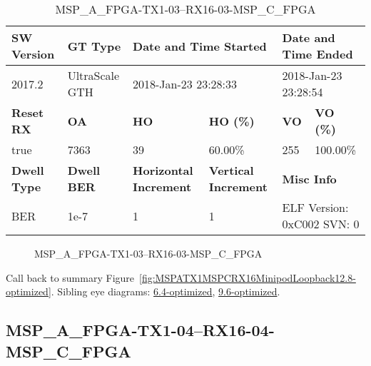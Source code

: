 \begin{table}[h]
\centering
\caption{MSP\_A\_FPGA-TX1-03--RX16-03-MSP\_C\_FPGA}
\label{tab:MSPAFPGATX103RX1603MSPCFPGA12.8-optimized}
\begin{tabular}{@{}|l|l|l|l|l|l|@{}}
\toprule
\textbf{SW Version}                & \textbf{GT Type}   & \multicolumn{2}{l|}{\textbf{Date and Time Started}}            & \multicolumn{2}{l|}{\textbf{Date and Time Ended}}        \\ \midrule
2017.2                       & UltraScale GTH          & \multicolumn{2}{l|}{2018-Jan-23 23:28:33}                   & \multicolumn{2}{l|}{2018-Jan-23 23:28:54}               \\ \midrule
\textbf{Reset RX}                  & \textbf{OA} & \textbf{HO}   & \textbf{HO (\%)} & \textbf{VO} & \textbf{VO (\%)} \\ \midrule
true & 7363        & 39          & 60.00\%        & 255        & 100.00\%       \\ \midrule
\textbf{Dwell Type}                & \textbf{Dwell BER} & \textbf{Horizontal Increment} & \textbf{Vertical Increment}    & \multicolumn{2}{l|}{\textbf{Misc Info}}                  \\ \midrule
BER                            & 1e-7        & 1        & 1           & \multicolumn{2}{l|}{ELF Version: 0xC002 SVN: 0}                         \\ \bottomrule
\end{tabular}
\end{table}

\begin{figure}[h]
\caption{MSP\_A\_FPGA-TX1-03--RX16-03-MSP\_C\_FPGA} \label{fig:MSPAFPGATX103RX1603MSPCFPGA12.8-optimized}
\end{figure}

Call back to summary Figure~\ref{fig:MSPATX1MSPCRX16MinipodLoopback12.8-optimized}.
Sibling eye diagrams: \hyperref[sec:MSPAFPGATX103RX1603MSPCFPGA6.4-optimized]{6.4-optimized}, \hyperref[sec:MSPAFPGATX103RX1603MSPCFPGA9.6-optimized]{9.6-optimized}.

\clearpage
\newpage


\subsection{MSP\_A\_FPGA-TX1-04--RX16-04-MSP\_C\_FPGA}\label{sec:MSPAFPGATX104RX1604MSPCFPGA12.8-optimized}

